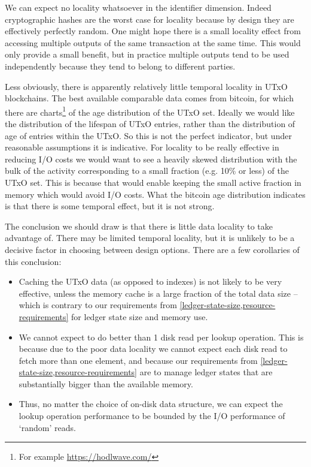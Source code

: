 \documentclass[11pt,a4paper]{article}
\begin{document}
We can expect no locality whatsoever in the identifier dimension. Indeed
cryptographic hashes are the worst case for locality because by design they are
effectively perfectly random. One might hope there is a small locality effect
from accessing multiple outputs of the same transaction at the same time. This
would only provide a small benefit, but in practice multiple outputs tend to be
used independently because they tend to belong to different parties.

Less obviously, there is apparently relatively little temporal locality in UTxO
blockchains. The best available comparable data comes from bitcoin, for which
there are charts\footnote{For example \url{https://hodlwave.com/}} of the age
distribution of the UTxO set. Ideally we would like the distribution of the
lifespan of UTxO entries, rather than the distribution of age of entries within
the UTxO. So this is not the perfect indicator, but under reasonable assumptions
it is indicative. For locality to be really effective in reducing I/O costs we
would want to see a heavily skewed distribution with the bulk of the activity
corresponding to a small fraction (e.g. 10\% or less) of the UTxO set. This is
because that would enable keeping the small active fraction in memory which
would avoid I/O costs. What the bitcoin age distribution indicates is that
there is some temporal effect, but it is not strong.

The conclusion we should draw is that there is little data locality to take
advantage of. There may be limited temporal locality, but it is unlikely
to be a decisive factor in choosing between design options. There are a few
corollaries of this conclusion:
\begin{itemize}
\item Caching the UTxO data (as opposed to indexes) is not likely to be very
      effective, unless the memory cache is a large fraction of the total data
      size -- which is contrary to our requirements from
      \cref{ledger-state-size,resource-requirements} for ledger state size and
      memory use.
\item We cannot expect to do better than 1 disk read per {\sc lookup} operation.
      This is because due to the poor data locality we cannot expect each disk
      read to fetch more than one element, and because our requirements from
      \cref{ledger-state-size,resource-requirements} are to manage ledger states
      that are substantially bigger than the available memory.
\item Thus, no matter the choice of on-disk data structure, we can expect the
      {\sc lookup} operation performance to be bounded by the I/O performance
      of `random' reads.
\end{itemize}
\end{document}
